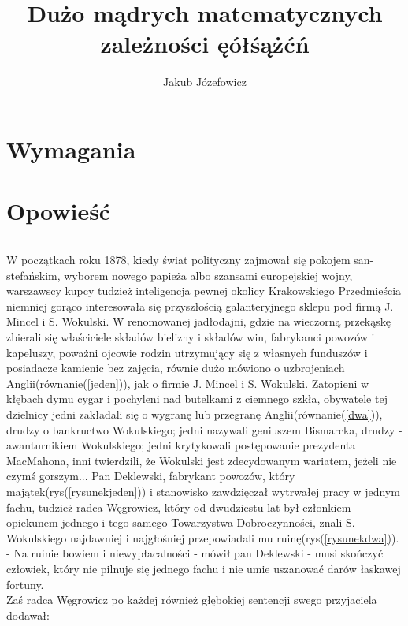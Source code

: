 \documentclass[11pt]{article}
\title{Dużo mądrych matematycznych zależności ęółśążćń}
\author{Jakub Józefowicz}
\begin{document}
\maketitle

\newpage
\part{Wymagania}


\newpage
\part{Opowieść}

\paragraph{}
W początkach roku 1878\cite{a}, kiedy świat polityczny zajmował się pokojem san-stefańskim, 
wyborem nowego papieża albo szansami europejskiej wojny, warszawscy kupcy tudzież inteligencja pewnej 
okolicy Krakowskiego Przedmieścia niemniej gorąco interesowała się przyszłością galanteryjnego sklepu pod firmą J. Mincel i S. Wokulski.
W renomowanej jadłodajni, gdzie na wieczorną przekąskę zbierali się właściciele składów bielizny i składów win, 
fabrykanci powozów i kapeluszy, poważni ojcowie rodzin utrzymujący się z własnych funduszów i posiadacze kamienic bez zajęcia, 
równie dużo mówiono o uzbrojeniach Anglii(równanie(\ref{jeden})), jak o firmie J. Mincel i S. Wokulski. Zatopieni w kłębach dymu cygar i pochyleni nad butelkami 
z ciemnego szkła, obywatele tej dzielnicy jedni zakładali się o wygranę lub przegranę Anglii(równanie(\ref{dwa})), drudzy o bankructwo Wokulskiego; 
jedni nazywali geniuszem Bismarcka, drudzy - awanturnikiem Wokulskiego; jedni krytykowali postępowanie prezydenta MacMahona, 
inni twierdzili, że Wokulski jest zdecydowanym wariatem, jeżeli nie czymś gorszym...
Pan Deklewski, fabrykant powozów, który majątek(rys(\ref{rysunekjeden})) i stanowisko zawdzięczał wytrwałej pracy w jednym fachu, 
tudzież radca Węgrowicz, który od dwudziestu lat był członkiem - opiekunem jednego i tego samego Towarzystwa Dobroczynności, 
znali S. Wokulskiego\cite{b} najdawniej i najgłośniej przepowiadali mu ruinę(rys(\ref{rysunekdwa})).\\
- Na ruinie bowiem i niewypłacalności - mówił pan Deklewski - musi skończyć człowiek, który nie pilnuje się jednego fachu i nie umie uszanować darów łaskawej fortuny.\\
Zaś radca Węgrowicz po każdej również głębokiej sentencji swego przyjaciela dodawał:\\
\end{document}
